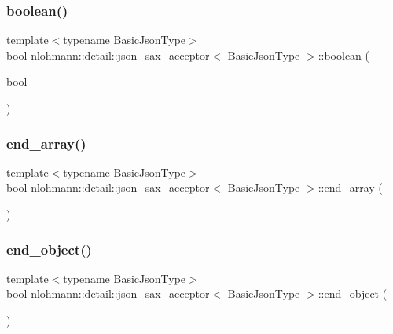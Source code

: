 \subsubsection{\texorpdfstring{boolean()}{boolean()}}
{\footnotesize\ttfamily template$<$typename Basic\+Json\+Type$>$ \\
bool \hyperlink{classnlohmann_1_1detail_1_1json__sax__acceptor}{nlohmann\+::detail\+::json\+\_\+sax\+\_\+acceptor}$<$ Basic\+Json\+Type $>$\+::boolean (\begin{DoxyParamCaption}\item[{bool}]{ }\end{DoxyParamCaption})\hspace{0.3cm}{\ttfamily [inline]}}

\mbox{\label{classnlohmann_1_1detail_1_1json__sax__acceptor_a22ef94ca5476a9563dcaca15b7d6e654}} 
\subsubsection{\texorpdfstring{end\+\_\+array()}{end\_array()}}
{\footnotesize\ttfamily template$<$typename Basic\+Json\+Type$>$ \\
bool \hyperlink{classnlohmann_1_1detail_1_1json__sax__acceptor}{nlohmann\+::detail\+::json\+\_\+sax\+\_\+acceptor}$<$ Basic\+Json\+Type $>$\+::end\+\_\+array (\begin{DoxyParamCaption}{ }\end{DoxyParamCaption})\hspace{0.3cm}{\ttfamily [inline]}}

\mbox{\label{classnlohmann_1_1detail_1_1json__sax__acceptor_a919645fd1827a561a994d70a435e3f19}} 
\subsubsection{\texorpdfstring{end\+\_\+object()}{end\_object()}}
{\footnotesize\ttfamily template$<$typename Basic\+Json\+Type$>$ \\
bool \hyperlink{classnlohmann_1_1detail_1_1json__sax__acceptor}{nlohmann\+::detail\+::json\+\_\+sax\+\_\+acceptor}$<$ Basic\+Json\+Type $>$\+::end\+\_\+object (\begin{DoxyParamCaption}{ }\end{DoxyParamCaption})\hspace{0.3cm}{\ttfamily [inline]}}

